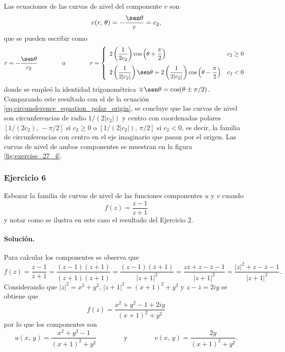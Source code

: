 \documentclass[a4paper]{report}
\begin{document}
Las ecuaciones de las curvas de nivel del componente \(v\) son
\[
 v(r,\,\theta)=-\frac{\sen\theta}{r}=c_2,
\]
que se pueden escribir como
\[
 r=-\frac{\sen\theta}{c_2}
 \qquad\qquad\textrm{o}\qquad\qquad
 r=\left\{ 
 \begin{array}{ll}
  2\left(\dfrac{1}{2c_2}\right)\cos\left(\theta+\dfrac{\pi}{2}\right) & c_2\geq0\\[\bigskipamount]
  2\left(\dfrac{1}{2|c_2|}\right)\sen\theta=2\left(\dfrac{1}{2|c_2|}\right)\cos\left(\theta-\dfrac{\pi}{2}\right) & c_2<0
 \end{array}
 \right.
\]
donde se empleó la identidad trigonométrica \(\mp\sen\theta=\cos(\theta\pm\pi/2)\). Comparando este resultado con el de la ecuación \ref{eq:circunsference_equation_polar_origin}, se concluye que las curvas de nivel son circunferencias de radio \(1/(2|c_2|)\) y centro con coordenadas polares \([1/(2c_2),\,-\pi/2]\) si \(c_2\geq0\) o \([1/(2|c_2|),\,\pi/2]\) si \(c_2<0\), es decir, la familia de circunferencias con centro en el eje imaginario que pasan por el origen. Las curvas de nivel de ambos componentes se muestran en la figura \ref{fig:exercise_27_4}.

\subsubsection{Ejercicio 6}

Esbozar la familia de curvas de nivel de las funciones componentes \(u\) y \(v\) cuando 
\[
 f(z)=\frac{z-1}{z+1}
\]
y notar como se ilustra en este caso el resultado del Ejercicio 2.

\paragraph{Solución.} Para calcular los componentes se observa que 
\[
 f(z)=\frac{z-1}{z+1}=\frac{(z-1)\overline{(z+1)}}{(z+1)\overline{(z+1)}}
  =\frac{(z-1)(\overline{z}+1)}{|z+1|^2}
  =\frac{z\overline{z}+z-\overline{z}-1}{|z+1|^2}
  =\frac{|z|^2+z-\overline{z}-1}{|z+1|^2}.
\]
Considerando que \(|z|^2=x^2+y^2\), \(|z+1|^2=(x+1)^2+y^2\) y \(z-\overline{z}=2iy\) se obtiene que 
\[
 f(z)=\frac{x^2+y^2-1+2iy}{(x+1)^2+y^2}
\]
por lo que los componentes son
\[
 u(x,\,y)=\frac{x^2+y^2-1}{(x+1)^2+y^2}
 \qquad\qquad\textrm{y}\qquad\qquad
 v(x,\,y)=\frac{2y}{(x+1)^2+y^2}.
\]
\end{document}
